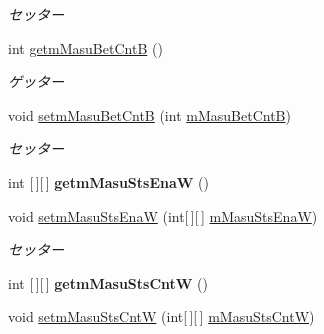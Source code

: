 \begin{DoxyCompactItemize}
\begin{DoxyCompactList}\small\item\em セッター \end{DoxyCompactList}\item 
int \hyperlink{classjp_1_1gr_1_1java__conf_1_1yuta__yoshinaga_1_1reversi_1_1model_1_1_reversi_a9eca6c8f158433303079e333a29ee564}{getm\+Masu\+Bet\+CntB} ()
\begin{DoxyCompactList}\small\item\em ゲッター \end{DoxyCompactList}\item 
void \hyperlink{classjp_1_1gr_1_1java__conf_1_1yuta__yoshinaga_1_1reversi_1_1model_1_1_reversi_af198b74e838b49c40661730ac639fae5}{setm\+Masu\+Bet\+CntB} (int \hyperlink{classjp_1_1gr_1_1java__conf_1_1yuta__yoshinaga_1_1reversi_1_1model_1_1_reversi_ad09160526b0dce0e8d0606c85ce52e3f}{m\+Masu\+Bet\+CntB})
\begin{DoxyCompactList}\small\item\em セッター \end{DoxyCompactList}\item 
\mbox{\label{classjp_1_1gr_1_1java__conf_1_1yuta__yoshinaga_1_1reversi_1_1model_1_1_reversi_a64f7bf09f1ce914bb51a7727da306307}} 
int \mbox{[}$\,$\mbox{]}\mbox{[}$\,$\mbox{]} {\bfseries getm\+Masu\+Sts\+EnaW} ()
\item 
void \hyperlink{classjp_1_1gr_1_1java__conf_1_1yuta__yoshinaga_1_1reversi_1_1model_1_1_reversi_adf6237e04e5d6966d96e2f4c1e59bb00}{setm\+Masu\+Sts\+EnaW} (int\mbox{[}$\,$\mbox{]}\mbox{[}$\,$\mbox{]} \hyperlink{classjp_1_1gr_1_1java__conf_1_1yuta__yoshinaga_1_1reversi_1_1model_1_1_reversi_a13c5c066fa8e0f0834c583448839dbba}{m\+Masu\+Sts\+EnaW})
\begin{DoxyCompactList}\small\item\em セッター \end{DoxyCompactList}\item 
\mbox{\label{classjp_1_1gr_1_1java__conf_1_1yuta__yoshinaga_1_1reversi_1_1model_1_1_reversi_a2512debcaa43b15d4200479e2a201bc4}} 
int \mbox{[}$\,$\mbox{]}\mbox{[}$\,$\mbox{]} {\bfseries getm\+Masu\+Sts\+CntW} ()
\item 
void \hyperlink{classjp_1_1gr_1_1java__conf_1_1yuta__yoshinaga_1_1reversi_1_1model_1_1_reversi_a539082d7e05f2f91ac1350eae0de4f7d}{setm\+Masu\+Sts\+CntW} (int\mbox{[}$\,$\mbox{]}\mbox{[}$\,$\mbox{]} \hyperlink{classjp_1_1gr_1_1java__conf_1_1yuta__yoshinaga_1_1reversi_1_1model_1_1_reversi_af0915b3095c755c161b9b8c5221588fb}{m\+Masu\+Sts\+CntW})

\end{DoxyCompactItemize}
